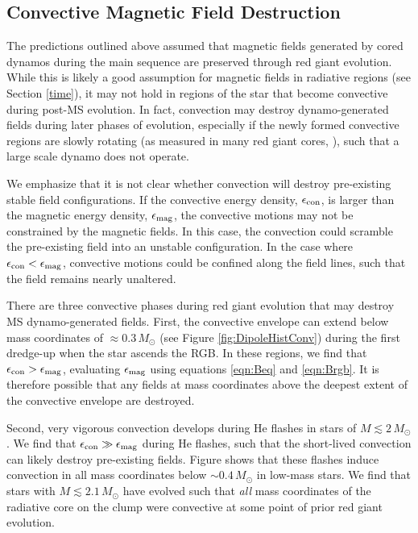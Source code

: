 \subsection{Convective Magnetic Field Destruction}

The predictions outlined above assumed that magnetic fields generated by cored dynamos during the main sequence are preserved through red giant evolution. While this is likely a good assumption for magnetic fields in radiative regions (see Section \ref{time}), it may not hold in regions of the star that become convective during post-MS evolution. In fact, convection may destroy dynamo-generated fields during later phases of evolution, especially if the newly formed convective regions are slowly rotating (as measured in many red giant cores, \cite{Mosser_2012}), such that a large scale dynamo does not operate.

We emphasize that it is not clear whether convection will destroy pre-existing stable field configurations. If the convective energy density, $\epsilon_{\rm con}$, is larger than the magnetic energy density, $\epsilon_{\rm mag}$, the convective motions may not be constrained by the magnetic fields. In this case, the convection could scramble the pre-existing field into an unstable configuration. In the case where $\epsilon_{\rm con} < \epsilon_{\rm mag}$, convective motions could be confined along the field lines, such that the field remains nearly unaltered.

There are three convective phases during red giant evolution that may destroy MS dynamo-generated fields. First, the convective envelope can extend below mass coordinates of $\approx 0.3 \, M_\odot$ (see Figure \ref{fig:DipoleHistConv}) during the first dredge-up when the star ascends the RGB. In these regions, we find that $\epsilon_{\rm con} > \epsilon_{\rm mag}$, evaluating $\epsilon_{\rm mag}$ using equations \ref{eqn:Beq} and \ref{eqn:Brgb}. It is therefore possible that any fields at mass coordinates above the deepest extent of the convective envelope are destroyed.

Second, very vigorous convection develops during He flashes in stars of $M \lesssim 2 \, M_\odot$. We find that $\epsilon_{\rm con} \gg \epsilon_{\rm mag}$ during He flashes, such that the short-lived convection can likely destroy pre-existing fields. Figure \label{fig:DipoleHistConv} shows that these flashes induce convection in all mass coordinates below $ \sim \! 0.4 \, M_\odot$ in low-mass stars. We find that stars with $M \lesssim 2.1 \, M_\odot$ have evolved such that {\it all} mass coordinates  of the radiative core on the clump were convective at some point of prior red giant evolution. 

